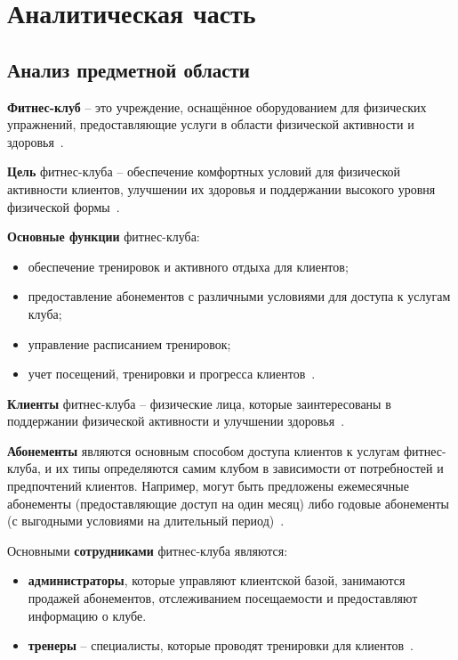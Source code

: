 \section{Аналитическая часть}

\subsection{Анализ предметной области}\label{scene}

\textbf{Фитнес-клуб} -- это учреждение, оснащённое оборудованием для физических упражнений, предоставляющие услуги в области физической активности и здоровья~\cite{IHRSA2019, leonquismondo2020service}. 

\textbf{Цель} фитнес-клуба -- обеспечение комфортных условий для физической активности клиентов, улучшении их здоровья и поддержании высокого уровня физической формы~\cite{IHRSA2019, leonquismondo2020service, bates2019health}.

\textbf{Основные функции} фитнес-клуба:
\begin{itemize}
	\item обеспечение тренировок и активного отдыха для клиентов;
	\item предоставление абонементов с различными условиями для доступа к услугам клуба;
	\item управление расписанием тренировок;
	\item учет посещений, тренировки и прогресса клиентов~\cite{bates2019health}.
\end{itemize}

\textbf{Клиенты} фитнес-клуба -- физические лица, которые заинтересованы в поддержании физической активности и улучшении здоровья~\cite{leonquismondo2020service, bates2019health}.

\textbf{Абонементы} являются основным способом доступа клиентов к услугам фитнес-клуба, и их типы определяются самим клубом в зависимости от потребностей и предпочтений клиентов. Например, могут быть предложены ежемесячные абонементы (предоставляющие доступ на один месяц) либо годовые абонементы (с выгодными условиями на длительный период)~\cite{bates2019health}.

Основными \textbf{сотрудниками} фитнес-клуба являются:
\begin{itemize}
	\item \textbf{администраторы}, которые управляют клиентской базой, занимаются продажей абонементов, отслеживанием посещаемости и предоставляют информацию о клубе.
	
	\item \textbf{тренеры} -- специалисты, которые проводят тренировки для клиентов~\cite{bates2019health}. 
\end{itemize}

